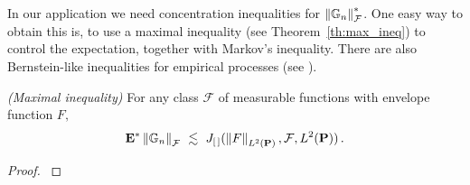 In our application we need concentration inequalities for 
$
  \left\lVert\mathbb{G}_n\right\rVert^*_\mathcal{F}
$.
One easy way to obtain this is, to use a maximal inequality (see Theorem~\ref{th:max_ineq}) to control the expectation,
together with Markov's inequality. There are also Bernstein-like inequalities for empirical processes (see \cite[§2.14.2]{vaart2013}). 
\begin{theorem}
  \label{th:max_ineq}
  \emph{(Maximal inequality)}
  For any class $\mathcal{F}$ of measurable functions with envelope function $F,$
  \begin{gather*}
    \E^*
    \norm{
      \G
      _n
      }
      _\mathcal{F}
    \ 
    \lesssim
    \ 
    J
    _{[\,]}
    (
    \norm{
      F
    }
    _{ L^2(\P)}
    ,
    \mathcal{F}
    ,
    L^2(\P)
    )
    \, 
    .
  \end{gather*}
\end{theorem}
\begin{proof}
  \cite[Corollary~19.35]{Vaart2000}
\end{proof}

